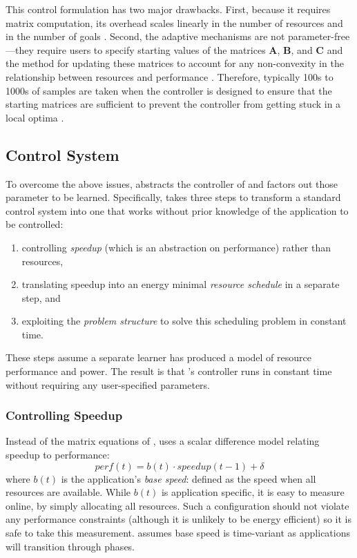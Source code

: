 This control formulation has two major drawbacks.  First, because it
requires matrix computation, its overhead scales linearly in the
number of resources and in the number of goals
\cite{Hellerstein2004a,METE}.  Second, the adaptive mechanisms are not
parameter-free---they require users to specify starting values of the
matrices $\mathbf{A}$, $\mathbf{B}$, and $\mathbf{C}$ and the method
for updating these matrices to account for any non-convexity in the
relationship between resources and performance
\cite{POET,METE,ControlWare,AdaptiveControl}.  Therefore, typically
100s to 1000s of samples are taken when the controller is designed to
ensure that the starting matrices are sufficient to prevent the
controller from getting stuck in a local optima
\cite{FSE2015,sysid,josep-isca2016}.

\subsection{\SYSTEM{} Control System}
To overcome the above issues, \SYSTEM{} abstracts the controller of
 and factors out those parameter to be learned.
Specifically, \SYSTEM{} takes three steps to transform a standard
control system into one that works without prior knowledge of the
application to be controlled:
\begin{enumerate}[leftmargin=1em]
\item controlling \emph{speedup} (which is an abstraction on performance) rather than resources,
\item translating speedup into an energy minimal \emph{resource
    schedule} in a separate step, and
\item exploiting the \emph{problem structure} to solve this scheduling
  problem in constant time.
\end{enumerate}
These steps assume a separate learner has produced a model of resource
performance and power.  The result is that \SYSTEM{}'s controller runs
in constant time without requiring any user-specified parameters.



\subsubsection{Controlling Speedup}
Instead of the matrix equations of , \SYSTEM{}
uses a scalar difference model relating speedup to performance:
\begin{equation}
  perf(t) = b(t) \cdot speedup(t-1) + \delta \label{eqn:speedup}
\end{equation}
where $b(t)$ is the application's \emph{base speed}: defined as the
speed when all resources are available.  While $b(t)$ is application
specific, it is easy to measure online, by simply allocating all
resources. Such a configuration should not violate any performance
constraints (although it is unlikely to be energy efficient) so it is
safe to take this measurement.  \SYSTEM{} assumes base speed is
time-variant as applications will transition through phases.


